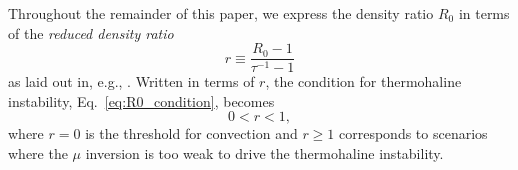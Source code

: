 Throughout the remainder of this paper, we express the density ratio $R_0$ in terms of the \textit{reduced density ratio}
\begin{equation} \label{eq:r}
    r \equiv \frac{R_0 - 1}{\tau^{-1} - 1}
\end{equation}
as laid out in, e.g., \citet{traxler_etal_2011,brown_etal_2013}.
Written in terms of $r$, the condition for thermohaline instability, Eq.~\eqref{eq:R0_condition}, becomes
\begin{equation} \label{eq:r_condition}
    0 < r < 1,
\end{equation}
where $r = 0$ is the threshold for convection and $r \geq 1$ corresponds to scenarios where the $\mu$ inversion is too weak to drive the thermohaline instability.